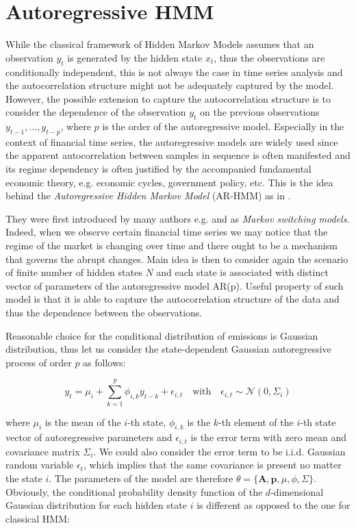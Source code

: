 \section{Autoregressive HMM}

While the classical framework of Hidden Markov Models assumes that an observation $y_t$ is generated by the hidden state $x_t$, thus the observations are conditionally independent, this is not always the case 
in time series analysis and the autocorrelation structure might not be adequately captured by the model. However, the possible extension to capture the autocorrelation structure is to consider the dependence of the
observation $y_t$ on the previous observations $y_{t-1},\ldots,y_{t-p}$, where $p$ is the order of the autoregressive model. Especially in the context of financial time series, the autoregressive models are widely used
since the apparent autocorrelation between samples in sequence is often manifested and its regime dependency is often justified by the accompanied fundamental economic theory, e.g. economic cycles, government policy, etc. \citep{Hamilton2005}
This is the idea behind the \textit{Autoregressive Hidden Markov Model} (AR-HMM) as in \citep{Ruiz-Suarez2021}.

They were first introduced by many authors e.g. \citep{Quandt1973} and \citep{Hamilton1989} as \textit{Markov switching models}. Indeed, when we observe certain financial time series we may notice that the regime of the market is changing over time 
and there ought to be a mechanism that governs the abrupt changes. Main idea is then to consider again the scenario of finite number of hidden states $N$ and each state is associated with distinct vector of parameters of the autoregressive model AR(p).
Useful property of such model is that it is able to capture the autocorrelation structure of the data and thus the dependence between the observations. \citep{Ruiz-Suarez2021}

Reasonable choice for the conditional distribution of emissions is Gaussian distribution, thus let us consider the state-dependent Gaussian autoregressive process of order $p$ as follows: 

\begin{equation} \label{eq: ar_hmm}
    y_t = \mu_{i} + \sum_{k=1}^{p} \phi_{i,k} y_{t-k} + \epsilon_{i,t} \quad \text{with} \quad \epsilon_{i,t  } \sim \mathcal{N}(0,\Sigma_{i})
\end{equation}

where $\mu_{i}$ is the mean of the $i$-th state, $\phi_{i,k}$ is the $k$-th element of the $i$-th state vector of autoregressive parameters and $\epsilon_{i,t}$ is the error term with zero mean and covariance matrix $\Sigma_{i}$. We could also consider 
the error term to be i.i.d. Gaussian random variable $\epsilon_t$, which implies that the same covariance is present no matter the state $i$. \citep{Xuan2004}
The parameters of the model are therefore $\theta = \{\textbf{A},\textbf{p},\mu,\phi,\Sigma\}$. Obviously, the conditional probability density function of the $d$-dimensional Gaussian distribution for each hidden state $i$ is different 
as opposed to the one for classical HMM:


